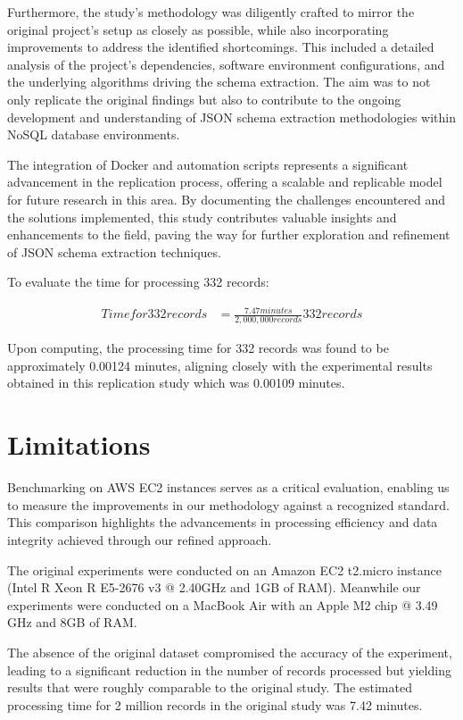 \documentclass[sigconf, nonacm]{acmart}
\begin{document}
Furthermore, the study's methodology was diligently crafted to mirror the original project's setup as closely as possible, while also incorporating improvements to address the identified shortcomings. This included a detailed analysis of the project's dependencies, software environment configurations, and the underlying algorithms driving the schema extraction. The aim was to not only replicate the original findings but also to contribute to the ongoing development and understanding of JSON schema extraction methodologies within NoSQL database environments.

The integration of Docker and automation scripts represents a significant advancement in the replication process, offering a scalable and replicable model for future research in this area. By documenting the challenges encountered and the solutions implemented, this study contributes valuable insights and enhancements to the field, paving the way for further exploration and refinement of JSON schema extraction techniques.

To evaluate the time for processing 332 records:

	\begin{equation} \label{eq1}
	\begin{split}
	Time for 332 records & = \frac{7.47 minutes}{2,000,000 records} 332 records
	\end{split}
	\end{equation}

Upon computing, the processing time for 332 records was found to be approximately 0.00124 minutes, aligning closely with the experimental results obtained in this replication study which was 0.00109 minutes.

\section{\textbf{Limitations}}

Benchmarking on  AWS EC2 instances serves as a critical evaluation, enabling us to measure the improvements in our methodology against a recognized standard. This comparison highlights the advancements in processing efficiency and data integrity achieved through our refined approach.

The original experiments were conducted on an Amazon EC2 t2.micro instance (Intel R Xeon R E5-2676 v3 @ 2.40GHz and 1GB of RAM). Meanwhile our experiments were conducted on a MacBook Air with an Apple M2 chip @ 3.49 GHz and 8GB of RAM.

The absence of the original dataset compromised the accuracy of the experiment, leading to a significant reduction in the number of records processed but yielding results that were roughly comparable to the original study. The estimated processing time for 2 million records in the original study was 7.42 minutes.
\end{document}
